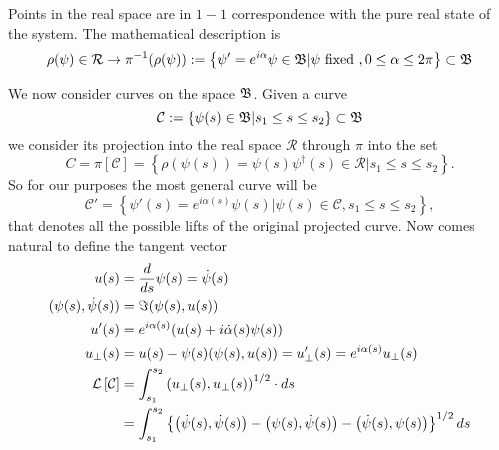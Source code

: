 Points in the real space are in $ 1-1 $ correspondence with the pure real state of the system. The mathematical description is
\begin{equation}
\rho(\psi)\in\mathcal{R}\to\pi^{-1}(\rho(\psi)):=\left\{\psi'=e^{i\alpha}\psi\in\mathfrak{B}|\psi \text{ fixed }, 0\leq\alpha\leq 2\pi \right\}\subset \mathfrak{B}
\end{equation}

We now consider curves on the space $ \mathfrak{B} $. Given a curve 
\begin{equation}
\mathcal{C}:=\left\{\psi(s)\in\mathfrak{B} |s_1\leq s\leq s_2 \right\}\subset \mathfrak{B}
\end{equation}
we consider its projection into the real space $ \mathcal{R} $ through $ \pi $ into the set 
\begin{equation}
C=\pi\left[\mathcal{C}\right]=\left\{\rho(\psi(s))=\psi(s)\psi^{\dagger}(s)\in\mathcal{R}|s_1\leq s\leq s_2 \right\}.
\end{equation}
So for our purposes the most general curve will be 
\begin{equation}
\mathcal{C}'=\left\{\psi'(s)=e^{i\alpha(s)}\psi(s)|\psi(s)\in\mathcal{C}, s_1\leq s\leq s_2 \right\},
\end{equation}
that denotes all the possible lifts of the original projected curve. Now comes natural to define the tangent vector 
\begin{align}
	u(s)&=\dfrac{d}{ds}\psi(s)=\dot{\psi}(s)\\
	(\psi(s),\dot{\psi}(s))&=\Im(\psi(s),u(s))\label{eq:3.12}\\
	u'(s)&=e^{i\alpha(s)}(u(s)+i\dot{\alpha}(s)\psi(s))\\
	u_{\perp}(s)&=u(s)-\psi(s)(\psi(s),u(s))=u_{\perp}'(s)=e^{i\alpha(s)}u_{\perp}(s)\\
	\mathcal{L}\left[\mathcal{C}\right]&=\int_{s_1}^{s_2}\left(u_{\perp}(s),u_{\perp}(s)\right)^{1/2}\cdot\mathop{}\!d s \\
	&=\int_{s_1}^{s_2}\left\{\left(\dot{\psi}(s),\dot{\psi}(s)\right)-\left(\psi(s),\dot{\psi}(s)\right)-\left(\dot{\psi}(s),\psi(s)\right) \right\}^{1/2} \mathop{}\!d s
\end{align}

